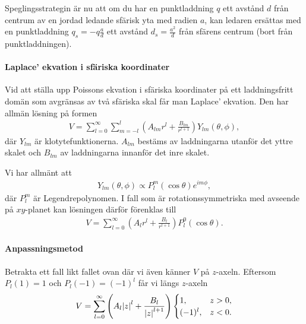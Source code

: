 Speglingsstrategin är nu att om du har en punktladdning $q$ ett avstånd $d$ från centrum av en jordad ledande sfärisk yta med radien $a$, kan ledaren ersättas med en punktladdning $q_{s} = -q\frac{a}{d}$ ett avstånd $d_{s} = \frac{a^{2}}{d}$ från sfärens centrum (bort från punktladdningen).

\paragraph{Laplace' ekvation i sfäriska koordinater}
Vid att ställa upp Poissons ekvation i sfäriska koordinater på ett laddningsfritt domän som avgränsas av två sfäriska skal får man Laplace' ekvation. Den har allmän lösning på formen
\begin{align*}
	V = \sum\limits_{l = 0}^{\infty}\sum\limits_{m = -l}^{l}\left(A_{lm}r^{l} + \frac{B_{lm}}{r^{l + 1}}\right)Y_{lm}(\theta, \phi),
\end{align*}
där $Y_{lm}$ är klotytefunktionerna. $A_{lm}$ bestäms av laddningarna utanför det yttre skalet och $B_{lm}$ av laddningarna innanför det inre skalet.

Vi har allmänt att
\begin{align*}
	Y_{lm}(\theta, \phi)\propto P_{l}^{m}(\cos{\theta})e^{im\phi},
\end{align*}
där $P_{l}^{m}$ är Legendrepolynomen. I fall som är rotationssymmetriska med avseende på $xy$-planet kan lösningen därför förenklas till
\begin{align*}
	V = \sum\limits_{l = 0}^{\infty}\left(A_{l}r^{l} + \frac{B_{l}}{r^{l + 1}}\right)P_{l}^{0}(\cos{\theta}).
\end{align*}

\paragraph{Anpassningsmetod}
Betrakta ett fall likt fallet ovan där vi även känner $V$ på $z$-axeln. Eftersom $P_{l}(1) = 1$ och $P_{l}(-1) = (-1)^{l}$ får vi längs $z$-axeln
\begin{align*}
	V = \sum\limits_{l = 0}^{\infty}\left(A_{l}\abs{z}^{l} + \frac{B_{l}}{\abs{z}^{l + 1}}\right)
	\begin{cases}
		1,        &z > 0, \\
		(-1)^{l}, &z < 0.
	\end{cases}
\end{align*}


